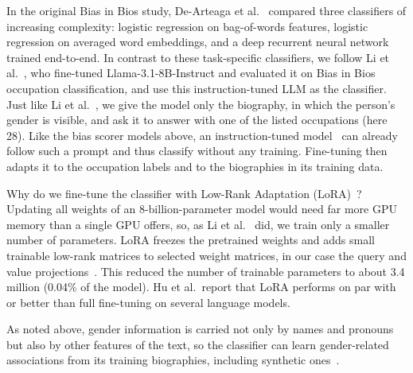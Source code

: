 \documentclass[sigconf]{acmart}
\begin{document}
In the original Bias in Bios study, De-Arteaga et al.~\cite{dearteaga2019bios} compared three classifiers of increasing complexity: logistic regression on bag-of-words features, logistic regression on averaged word embeddings, and a deep recurrent neural network trained end-to-end.
In contrast to these task-specific classifiers, we follow Li et al.~\cite{li2026inheritance}, who fine-tuned Llama-3.1-8B-Instruct and evaluated it on Bias in Bios occupation classification, and use this instruction-tuned LLM as the classifier.
Just like Li et al.~\cite{li2026inheritance}, we give the model only the biography, in which the person's gender is visible, and ask it to answer with one of the listed occupations (here 28).
Like the bias scorer models above, an instruction-tuned model~\cite{grattafiori2024llama} can already follow such a prompt and thus classify without any training. Fine-tuning then adapts it to the occupation labels and to the biographies in its training data.

Why do we fine-tune the classifier with Low-Rank Adaptation (LoRA)~\cite{hu2022lora}?
Updating all weights of an 8-billion-parameter model would need far more GPU memory than a single GPU offers, so, as Li et al.~\cite{li2026inheritance} did, we train only a smaller number of parameters.
LoRA freezes the pretrained weights and adds small trainable low-rank matrices to selected weight matrices, in our case the query and value projections~\cite{hu2022lora}.
This reduced the number of trainable parameters to about 3.4 million (0.04\% of the model). Hu et al.\ report that LoRA performs on par with or better than full fine-tuning on several language models.

As noted above, gender information is carried not only by names and pronouns but also by other features of the text, so the classifier can learn gender-related associations from its training biographies, including synthetic ones~\cite{li2026inheritance}.
\end{document}
